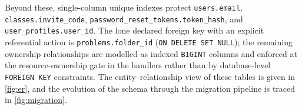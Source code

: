 Beyond these, single-column unique indexes protect \texttt{users.email},
\texttt{classes.invite\_code}, \texttt{password\_reset\_tokens.token\_hash}, and
\texttt{user\_profiles.user\_id}. The lone declared foreign key with an explicit
referential action is \texttt{problems.folder\_id}
(\texttt{ON DELETE SET NULL}); the remaining ownership relationships are modelled
as indexed \texttt{BIGINT} columns and enforced at the resource-ownership gate in
the handlers rather than by database-level \texttt{FOREIGN KEY} constraints. The
entity--relationship view of these tables is given in \cref{fig:er}, and the
evolution of the schema through the migration pipeline is traced in
\cref{fig:migration}.
